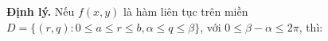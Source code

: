 \documentclass[preview]{standalone}
\begin{document}
\begin{center}
\textbf{Định lý.} Nếu $f(x, y)$ là hàm liên tục trên miền $D = \{(r, q): 0 \leq a \leq r \leq b, \alpha \leq q \leq \beta\}$, với $0 \leq \beta - \alpha \leq 2\pi$, thì:
\end{center}
\end{document}
